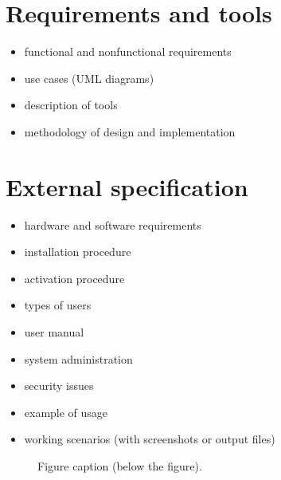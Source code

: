 \documentclass[a4paper,twoside,12pt]{book}
\begin{document}
\chapter{Requirements and tools}

\begin{itemize}
\item functional and nonfunctional requirements
\item use cases (UML diagrams)
\item description of tools
\item methodology of design and implementation
\end{itemize} 

\chapter{External specification}
\begin{itemize}
\item hardware and software requirements
\item installation procedure
\item activation procedure
\item types of users
\item user manual
\item system administration
\item security issues
\item example of usage
\item working scenarios (with screenshots or output files)
\end{itemize}



 
\begin{figure}
\centering
{}
\caption{Figure caption (below the figure).}
\label{fig:2}
\end{figure}
\end{document}
